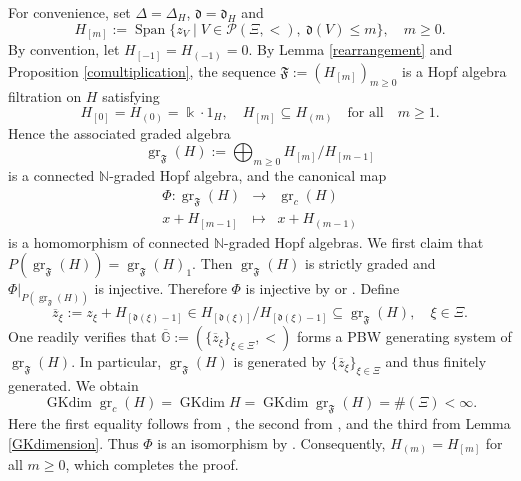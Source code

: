 \documentclass{article}
\makeatletter
\renewenvironment{proof}[1][\proofname]{\par
	\pushQED{\qed}%
	\normalfont \topsep6\p@\@plus6\p@\relax
	\trivlist
	\item[\hskip\labelsep
	\bfseries
	#1\@addpunct{.}]\ignorespaces
}{%
	\popQED\endtrivlist\@endpefalse
}
\theoremstyle{plain}
\theoremstyle{definition}
\numberwithin{equation}{section}
\DeclareMathOperator{\gr}{gr}
\DeclareMathOperator{\Span}{Span}
\DeclareMathOperator{\GKdim}{GKdim}
\newcommand{\GG}{\mathbb{G}}
\newcommand{\dd}{\mathfrak{d}}
\makeatother
\begin{document}
	\begin{proof}[Proof of Proposition \ref{coradical filtration}]
		For convenience, set $\Delta=\Delta_{H}$, $\dd = \dd_{H}$ and
		\[
		H_{[m]}:=\Span\{z_{V}\mid V\in\mathcal{P}(\Xi,<),\ \dd(V)\le m\},\quad m\ge0.
		\]
		By convention, let $H_{[-1]} = H_{(-1)} = 0$. By Lemma \ref{rearrangement} and Proposition \ref{comultiplication}, the sequence $\mathfrak{F}:=(H_{[m]})_{m\geq 0}$ is a Hopf algebra filtration on $H$ satisfying
		\[
		H_{[0]}=H_{(0)} =\Bbbk \cdot 1_{H}, \quad H_{[m]}\subseteq H_{(m)} \quad \text{for all} \quad m\geq 1.
		\]
		Hence the associated graded algebra
		\[
		\gr_{\mathfrak{F}}(H):= \bigoplus_{m\geq 0}H_{[m]}/H_{[m-1]}
		\]
		is a connected $\mathbb{N}$-graded Hopf algebra, and the canonical map
		\begin{eqnarray*}
			\Phi \colon \gr_{\mathfrak{F}}(H) &\longrightarrow& \gr_{c}(H) \\
			x+ H_{[m-1]} &\mapsto& x+H_{(m-1)}
		\end{eqnarray*}
		is a homomorphism of connected $\mathbb{N}$-graded Hopf algebras. We first claim that $P(\gr_{\mathfrak{F}}(H)) = \gr_{\mathfrak{F}}(H)_{1}$. Then $\gr_{\mathfrak{F}}(H)$ is strictly graded and $\Phi|_{P(\gr_{\mathfrak{F}}(H))}$ is injective. Therefore $\Phi$ is injective by \cite[Corollary 1.3.11]{HS20} or \cite[Lemma 5.3.3]{Mo93}. Define
		\[
		\overline{z}_{\xi}:= z_{\xi} +H_{[\dd(\xi)-1]} \in H_{[\dd(\xi)]}/H_{[\dd(\xi)-1]} \subseteq \gr_{\mathfrak{F}}(H), \quad \xi \in \Xi.
		\]
		One readily verifies that $\overline{\GG}:=(\{\overline{z}_{\xi}\}_{\xi\in \Xi}, <)$ forms a PBW generating system of $\gr_{\mathfrak{F}}(H)$. In particular, $\gr_{\mathfrak{F}}(H)$ is generated by $\{\overline{z}_{\xi}\}_{\xi\in \Xi}$ and thus finitely generated. We obtain
		\[
		\GKdim \gr_{c}(H) = \GKdim H = \GKdim \gr_{\mathfrak{F}}(H) = \#(\Xi) < \infty.
		\]
		Here the first equality follows from \cite[Proposition 3.4]{ZSL20}, the second from \cite[Proposition 6.6]{KL00}, and the third from Lemma \ref{GKdimension}. Thus $\Phi$ is an isomorphism by \cite[Theorem A]{LZ23}. Consequently, $H_{(m)} = H_{[m]}$ for all $m\geq 0$, which completes the proof.
		

\end{proof}
\end{document}

